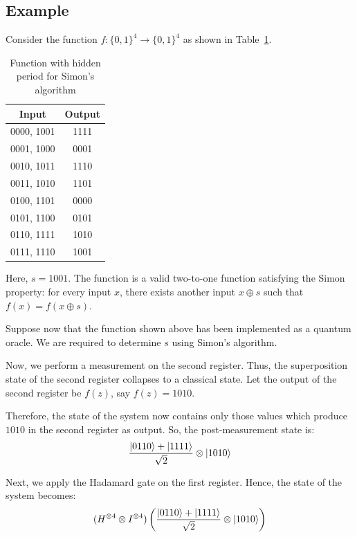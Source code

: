 \subsection{Example}
\begin{example}
    Consider the function $f:\{0,1\}^4 \rightarrow \{0,1\}^4$ as shown in Table~\ref{tab:simonex2}.
    \begin{table}[H]
        \centering
        \begin{tabular}{|c|c|}
            \hline
            Input & Output \\
            \hline
            0000, 1001 & 1111 \\
            0001, 1000 & 0001 \\
            0010, 1011 & 1110 \\
            0011, 1010 & 1101 \\
            0100, 1101 & 0000 \\
            0101, 1100 & 0101 \\
            0110, 1111 & 1010 \\
            0111, 1110 & 1001 \\
            \hline
        \end{tabular}
        \caption{Function with hidden period for Simon’s algorithm}
        \label{tab:simonex2}
    \end{table}

    Here, $s = 1001$. The function is a valid two-to-one function satisfying the Simon property: for every input $x$, there exists another input $x \oplus s$ such that $f(x) = f(x \oplus s)$.

    Suppose now that the function shown above has been implemented as a quantum oracle. We are required to determine $s$ using Simon's algorithm.
    
    Now, we perform a measurement on the second register. Thus, the superposition state of the second register collapses to a classical state. Let the output of the second register be $f(z)$, say $f(z) = 1010$.

Therefore, the state of the system now contains only those values which produce $1010$ in the second register as output. So, the post-measurement state is:
\[
    \frac{\ket{0110} + \ket{1111}}{\sqrt{2}} \otimes \ket{1010}
\]

Next, we apply the Hadamard gate on the first register. Hence, the state of the system becomes:
\[
    (H^{\otimes 4} \otimes I^{\otimes 4})\left(\frac{\ket{0110} + \ket{1111}}{\sqrt{2}} \otimes \ket{1010}\right)
\]


\end{example}
